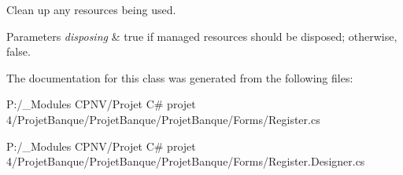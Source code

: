Clean up any resources being used. 


\begin{DoxyParams}{Parameters}
{\em disposing} & true if managed resources should be disposed; otherwise, false.\\
\hline
\end{DoxyParams}


The documentation for this class was generated from the following files\+:\begin{DoxyCompactItemize}
\item 
P\+:/\+\_\+\+Modules C\+P\+N\+V/\+Projet C\# projet 4/\+Projet\+Banque/\+Projet\+Banque/\+Projet\+Banque/\+Forms/Register.\+cs\item 
P\+:/\+\_\+\+Modules C\+P\+N\+V/\+Projet C\# projet 4/\+Projet\+Banque/\+Projet\+Banque/\+Projet\+Banque/\+Forms/Register.\+Designer.\+cs\end{DoxyCompactItemize}
